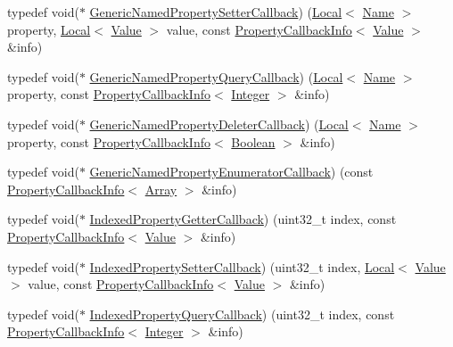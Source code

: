 \begin{DoxyCompactItemize}
\item 
typedef void($\ast$ \hyperlink{namespacev8_af74716c6e95a269c6cd4314662fd0a7e}{Generic\+Named\+Property\+Setter\+Callback}) (\hyperlink{classv8_1_1_local}{Local}$<$ \hyperlink{classv8_1_1_name}{Name} $>$ property, \hyperlink{classv8_1_1_local}{Local}$<$ \hyperlink{classv8_1_1_value}{Value} $>$ value, const \hyperlink{classv8_1_1_property_callback_info}{Property\+Callback\+Info}$<$ \hyperlink{classv8_1_1_value}{Value} $>$ \&info)
\item 
typedef void($\ast$ \hyperlink{namespacev8_add9f7ab11e4a9a2b9ad2c4536b0e1a64}{Generic\+Named\+Property\+Query\+Callback}) (\hyperlink{classv8_1_1_local}{Local}$<$ \hyperlink{classv8_1_1_name}{Name} $>$ property, const \hyperlink{classv8_1_1_property_callback_info}{Property\+Callback\+Info}$<$ \hyperlink{classv8_1_1_integer}{Integer} $>$ \&info)
\item 
typedef void($\ast$ \hyperlink{namespacev8_ad2aecc0406ea4bc02d5a4f84a433b273}{Generic\+Named\+Property\+Deleter\+Callback}) (\hyperlink{classv8_1_1_local}{Local}$<$ \hyperlink{classv8_1_1_name}{Name} $>$ property, const \hyperlink{classv8_1_1_property_callback_info}{Property\+Callback\+Info}$<$ \hyperlink{classv8_1_1_boolean}{Boolean} $>$ \&info)
\item 
typedef void($\ast$ \hyperlink{namespacev8_a20826eb7e52e84fa4f632534e8eddd04}{Generic\+Named\+Property\+Enumerator\+Callback}) (const \hyperlink{classv8_1_1_property_callback_info}{Property\+Callback\+Info}$<$ \hyperlink{classv8_1_1_array}{Array} $>$ \&info)
\item 
typedef void($\ast$ \hyperlink{namespacev8_a48e7816ba64447bf32a25d194588daaf}{Indexed\+Property\+Getter\+Callback}) (uint32\+\_\+t index, const \hyperlink{classv8_1_1_property_callback_info}{Property\+Callback\+Info}$<$ \hyperlink{classv8_1_1_value}{Value} $>$ \&info)
\item 
typedef void($\ast$ \hyperlink{namespacev8_a4ac7cc6185ebc8b6a199f9fa8e6bf5c3}{Indexed\+Property\+Setter\+Callback}) (uint32\+\_\+t index, \hyperlink{classv8_1_1_local}{Local}$<$ \hyperlink{classv8_1_1_value}{Value} $>$ value, const \hyperlink{classv8_1_1_property_callback_info}{Property\+Callback\+Info}$<$ \hyperlink{classv8_1_1_value}{Value} $>$ \&info)
\item 
typedef void($\ast$ \hyperlink{namespacev8_a980b62c33eb664783e61e25c3b27f9ee}{Indexed\+Property\+Query\+Callback}) (uint32\+\_\+t index, const \hyperlink{classv8_1_1_property_callback_info}{Property\+Callback\+Info}$<$ \hyperlink{classv8_1_1_integer}{Integer} $>$ \&info)

\end{DoxyCompactItemize}
